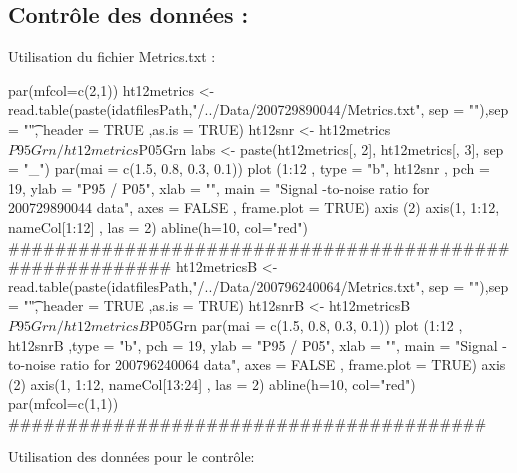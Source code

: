 \documentclass[a4paper,10pt]{article}
\begin{document}
\subsection{Contrôle des données :}
Utilisation du fichier Metrics.txt :
\begin{Schunk}
\begin{Sinput}
 par(mfcol=c(2,1))
 ht12metrics  <- read.table(paste(idatfilesPath,"/../Data/200729890044/Metrics.txt",
 sep = ""),sep = "\t", header = TRUE ,as.is = TRUE)
 ht12snr  <- ht12metrics$P95Grn/ht12metrics$P05Grn
 labs  <- paste(ht12metrics[, 2],  ht12metrics[, 3], sep = "_")
 par(mai = c(1.5, 0.8, 0.3, 0.1))
 plot (1:12 , type = "b",  ht12snr , pch = 19, ylab = "P95 / P05", xlab = "",
 main = "Signal -to-noise  ratio  for  200729890044  data", axes = FALSE ,
 frame.plot = TRUE)
 axis (2)
 axis(1, 1:12, nameCol[1:12] , las = 2)
 abline(h=10, col="red")
 #########################################################
 ht12metricsB  <- read.table(paste(idatfilesPath,"/../Data/200796240064/Metrics.txt",
 sep = ""),sep = "\t", header = TRUE ,as.is = TRUE)
 ht12snrB  <- ht12metricsB$P95Grn/ht12metricsB$P05Grn
 par(mai = c(1.5, 0.8, 0.3, 0.1))
 plot (1:12 ,  ht12snrB ,type = "b", pch = 19, ylab = "P95 / P05", xlab = "",
 main = "Signal -to-noise  ratio  for  200796240064  data", axes = FALSE ,
 frame.plot = TRUE)
 axis (2)
 axis(1, 1:12, nameCol[13:24] , las = 2)
 abline(h=10, col="red")
 par(mfcol=c(1,1))
 #########################################
\end{Sinput}
\end{Schunk}
Utilisation des données pour le contrôle:
\end{document}
